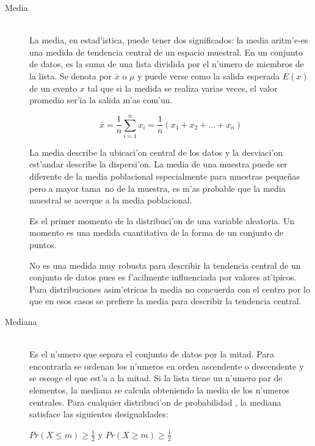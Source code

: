 \begin{description}
\item [Media] \hfill \\
La media, en estad'istica, puede tener dos significados: la media aritm'e-\linebreak es una medida de tendencia central de un espacio muestral. En un conjunto de datos, es la suma de una lista dividida por el n'umero de miembros de la lista. Se denota por $\bar{x}$ o $\mu$ y puede verse como la salida esperada $E(x)$ de un evento $x$ tal que si la medida se realiza varias veces, el valor promedio ser'ia la salida m'as com'un.

\[
    \bar{x} =\frac{1}{n}\sum_{i=1}^{n}x_i = \frac{1}{n}(x_1+x_2+...+x_n)
\]

La media describe la ubicaci'on central de los datos y la desviaci'on est'andar describe la dispersi'on. La media de una muestra puede ser diferente de la media poblacional especialmente para muestras peque\~{n}as pero a mayor tama~{n}o de la muestra, es m'as probable que la media muestral se acerque a la media poblacional.

Es el primer momento de la distribuci'on de una variable aleatoria. Un momento es una medida cuantitativa de la forma de un conjunto de puntos.

No es una medida muy robusta para describir la tendencia central de un conjunto de datos pues es f'acilmente influenciada por valores at'ipicos. Para distribuciones asim'etricas la media no concuerda con el centro por lo que en esos casos se prefiere la media para describir la tendencia central.

\item [Mediana] \hfill \\
Es el n'umero que separa el conjunto de datos por la mitad. Para encontrarla se ordenan los n'umeros en orden ascendente o descendente y se escoge el que est'a a la mitad. Si la lista tiene un n'umero par de elementos, la mediana se calcula obteniendo la media de los n'umeros centrales. Para cualquier distribuci'on de probabilidad , la mediana satisface las siguientes desigualdades:

\begin{center}
$    Pr(X \leq m) \geq \frac{1}{2} $
y 
$
    Pr(X \geq m) \geq \frac{1}{2}
$
\end{center}


\end{description}
